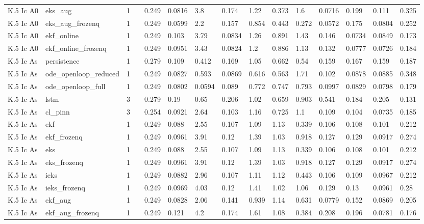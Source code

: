 \begin{table}[t]
\begin{tabular}{lllllllllllllll}
K.5 Ic A0 & eks\_aug & 1 &  & 0.249 & 0.0816 & 3.8 & 0.174 & 1.22 & 0.373 & 1.6 & 0.0716 & 0.199 & 0.111 & 0.325 \\
K.5 Ic A0 & eks\_aug\_frozenq & 1 &  & 0.249 & 0.0599 & 2.2 & 0.157 & 0.854 & 0.443 & 0.272 & 0.0572 & 0.175 & 0.0804 & 0.252 \\
K.5 Ic A0 & ekf\_online & 1 &  & 0.249 & 0.103 & 3.79 & 0.0834 & 1.26 & 0.891 & 1.43 & 0.146 & 0.0734 & 0.0849 & 0.173 \\
K.5 Ic A0 & ekf\_online\_frozenq & 1 &  & 0.249 & 0.0951 & 3.43 & 0.0824 & 1.2 & 0.886 & 1.13 & 0.132 & 0.0777 & 0.0726 & 0.184 \\
K.5 Ic As & persistence & 1 &  & 0.279 & 0.109 & 0.412 & 0.169 & 1.05 & 0.662 & 0.54 & 0.159 & 0.167 & 0.159 & 0.187 \\
K.5 Ic As & ode\_openloop\_reduced & 1 &  & 0.249 & 0.0827 & 0.593 & 0.0869 & 0.616 & 0.563 & 1.71 & 0.102 & 0.0878 & 0.0885 & 0.348 \\
K.5 Ic As & ode\_openloop\_full & 1 &  & 0.249 & 0.0802 & 0.0594 & 0.089 & 0.772 & 0.747 & 0.793 & 0.0997 & 0.0829 & 0.0798 & 0.179 \\
K.5 Ic As & lstm & 3 &  & 0.279 & 0.19 & 0.65 & 0.206 & 1.02 & 0.659 & 0.903 & 0.541 & 0.184 & 0.205 & 0.131 \\
K.5 Ic As & cl\_pinn & 3 &  & 0.254 & 0.0921 & 2.64 & 0.103 & 1.16 & 0.725 & 1.1 & 0.109 & 0.104 & 0.0735 & 0.185 \\
K.5 Ic As & ekf & 1 &  & 0.249 & 0.088 & 2.55 & 0.107 & 1.09 & 1.13 & 0.339 & 0.106 & 0.108 & 0.101 & 0.212 \\
K.5 Ic As & ekf\_frozenq & 1 &  & 0.249 & 0.0961 & 3.91 & 0.12 & 1.39 & 1.03 & 0.918 & 0.127 & 0.129 & 0.0917 & 0.274 \\
K.5 Ic As & eks & 1 &  & 0.249 & 0.088 & 2.55 & 0.107 & 1.09 & 1.13 & 0.339 & 0.106 & 0.108 & 0.101 & 0.212 \\
K.5 Ic As & eks\_frozenq & 1 &  & 0.249 & 0.0961 & 3.91 & 0.12 & 1.39 & 1.03 & 0.918 & 0.127 & 0.129 & 0.0917 & 0.274 \\
K.5 Ic As & ieks & 1 &  & 0.249 & 0.0882 & 2.96 & 0.107 & 1.11 & 1.12 & 0.443 & 0.106 & 0.109 & 0.0967 & 0.212 \\
K.5 Ic As & ieks\_frozenq & 1 &  & 0.249 & 0.0969 & 4.03 & 0.12 & 1.41 & 1.02 & 1.06 & 0.129 & 0.13 & 0.0961 & 0.28 \\
K.5 Ic As & ekf\_aug & 1 &  & 0.249 & 0.0828 & 2.06 & 0.141 & 0.939 & 1.14 & 0.631 & 0.0779 & 0.152 & 0.0869 & 0.205 \\
K.5 Ic As & ekf\_aug\_frozenq & 1 &  & 0.249 & 0.121 & 4.2 & 0.174 & 1.61 & 1.08 & 0.384 & 0.208 & 0.196 & 0.0781 & 0.176 \\

\end{tabular}
\end{table}
